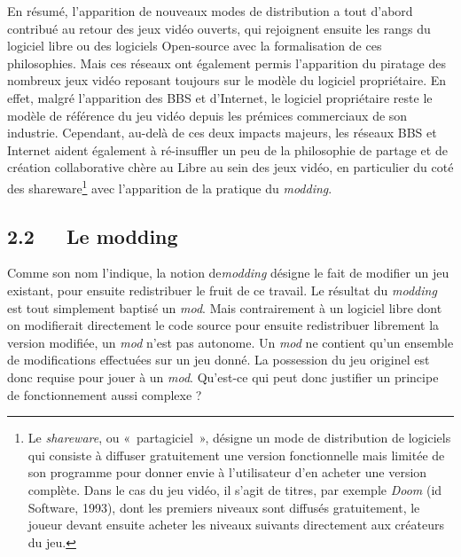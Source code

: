 \documentclass{FramateX}
\begin{document}
\begin{refsection}
En résumé, l'apparition de nouveaux modes de distribution a tout d'abord
contribué au retour des jeux vidéo ouverts, qui rejoignent ensuite les
rangs du logiciel libre ou des logiciels Open-source avec la
formalisation de ces philosophies. Mais ces réseaux ont également
permis l'apparition du piratage des nombreux jeux vidéo reposant
toujours sur le modèle du logiciel propriétaire. En effet, malgré
l'apparition des BBS et d'Internet, le logiciel propriétaire reste le
modèle de référence du jeu vidéo depuis les prémices commerciaux de son
industrie. Cependant, au-delà de ces deux impacts majeurs, les réseaux
BBS et Internet aident également à ré-insuffler un peu de la
philosophie de partage et de création collaborative chère au Libre au
sein des jeux vidéo, en particulier du coté des shareware\footnote{Le
\textit{shareware}, ou «~partagiciel~», désigne un mode de distribution de
logiciels qui consiste à diffuser gratuitement une version
fonctionnelle mais limitée de son programme pour donner envie à
l'utilisateur d'en acheter une version complète. Dans le cas du jeu
vidéo, il s'agit de titres, par exemple \textit{Doom} (id Software,
1993), dont les premiers niveaux sont diffusés gratuitement, le joueur
devant ensuite acheter les niveaux suivants directement aux créateurs
du jeu.} avec l'apparition de la pratique du \textit{modding}.




\subsection*{2.2~~~Le modding}
{}

Comme son nom l'indique, la notion de\textit{modding} désigne le fait de modifier
un jeu existant, pour ensuite redistribuer le fruit de ce travail. Le
résultat du \textit{modding} est tout
simplement baptisé un \textit{mod}. Mais
contrairement à un logiciel libre dont on modifierait directement le
code source pour ensuite redistribuer librement la version modifiée, un \textit{mod} n'est pas autonome. Un \textit{mod} ne contient qu'un ensemble de
modifications effectuées sur un jeu donné. La possession du jeu
originel est donc requise pour jouer à un \textit{mod}. Qu'est-ce qui peut donc
justifier un principe de fonctionnement aussi complexe ?



\end{refsection}
\end{document}
